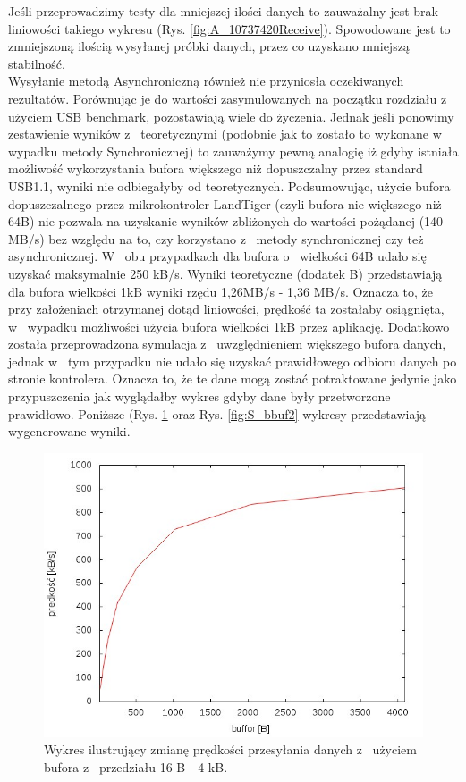 \documentclass{BscUS}
\begin{document}
\noindent Jeśli przeprowadzimy testy dla mniejszej ilości danych to zauważalny jest brak liniowości takiego wykresu (Rys. \ref{fig:A_10737420Receive}). Spowodowane jest to zmniejszoną ilością wysyłanej próbki danych, przez co uzyskano mniejszą stabilność. \\
\indent Wysyłanie metodą Asynchroniczną również nie przyniosła oczekiwanych rezultatów. Porównując je do wartości zasymulowanych na początku rozdziału z~ użyciem USB benchmark, pozostawiają wiele do życzenia. Jednak jeśli ponowimy zestawienie wyników z~ teoretycznymi (podobnie jak to zostało to wykonane w~ wypadku metody Synchronicznej) to zauważymy pewną analogię iż gdyby istniała możliwość wykorzystania bufora większego niż dopuszczalny przez standard USB1.1, wyniki nie odbiegałyby od teoretycznych.
\indent Podsumowując, użycie bufora dopuszczalnego przez mikrokontroler LandTiger (czyli bufora nie większego niż 64B) nie pozwala na uzyskanie wyników zbliżonych do wartości pożądanej (140 MB/s) bez względu na to, czy korzystano z~ metody synchronicznej czy też asynchronicznej. W~ obu przypadkach dla bufora o~ wielkości 64B udało się uzyskać maksymalnie 250 kB/s. Wyniki teoretyczne (dodatek B) przedstawiają dla bufora wielkości 1kB wyniki rzędu 1,26MB/s - 1,36 MB/s. Oznacza to, że przy założeniach otrzymanej dotąd liniowości, prędkość ta zostałaby osiągnięta, w~ wypadku możliwości użycia bufora wielkości 1kB przez aplikację.
\newline
\noindent Dodatkowo została przeprowadzona symulacja z~ uwzględnieniem większego bufora danych, jednak w~ tym przypadku nie udało się uzyskać prawidłowego odbioru danych  po stronie kontrolera. Oznacza to, że te dane mogą zostać potraktowane jedynie jako przypuszczenia jak wyglądałby wykres gdyby dane były przetworzone prawidłowo. Poniższe (Rys. \ref{fig:S_bbuf1} oraz Rys. \ref{fig:S_bbuf2} wykresy przedstawiają wygenerowane wyniki.
\begin{figure}[H]
{
\centering
\includegraphics[width=1\textwidth]{./img/S_bbuf1}
\caption{Wykres ilustrujący zmianę prędkości przesyłania danych z~ użyciem bufora z~ przedziału 16 B - 4 kB.}
\label{fig:S_bbuf1}
}
\end{figure}
\end{document}
